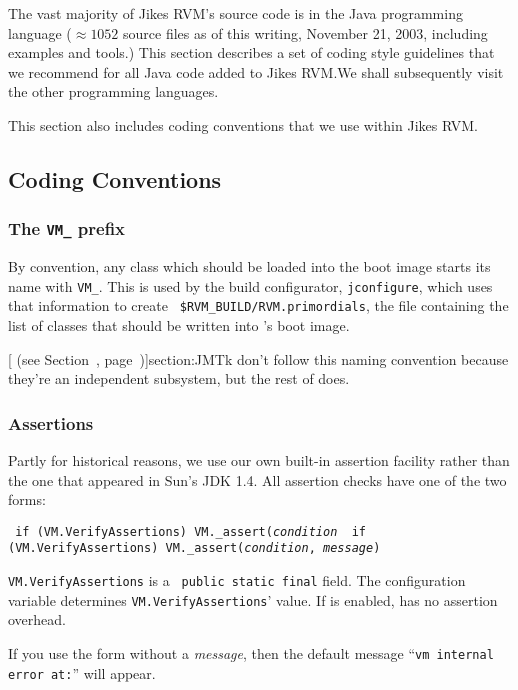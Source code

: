 The vast majority of Jikes\TMweb{} RVM's source code is in the Java\TMweb{}
programming language ($\approx 1052$ source files as of this writing,
November 21, 2003, including examples and tools.)  This section
describes a set of 
coding style guidelines that we recommend for all Java code added to
Jikes RVM.\@  We shall subsequently visit the other programming languages.

This section also includes coding conventions that we
use within Jikes RVM.\@  

\subsection{Coding Conventions}

\subsubsection{The {\tt VM\_} prefix}

By convention, any class which should be loaded into the boot image
starts its name with {\tt VM\_}.  This is used by the build configurator,
{\tt jconfigure}, which uses that information to create {\tt
\$RVM\-\_\-BUILD\-/\-R\-V\-M\-.pri\-mor\-di\-als}, the file containing the list of classes
that should be written into \jrvm{}'s  boot image.

[ (see Section~\Ref, page~\Pageref)]{section:JMTk} don't follow this naming convention
because they're an independent subsystem, but the rest of \jrvm{} does.

\subsubsection{Assertions}
\label{assertions}

Partly for historical reasons, we use our own built-in assertion
facility rather than the one that appeared in Sun\Rweb{}'s JDK 1.4.   All
assertion checks have one of the two forms:
\begin{example}
\tt{}    if (VM.VerifyAssertions)  VM._assert({\it condition}
\tt{}    if (VM.VerifyAssertions)  VM._assert({\it condition}, {\it message})
\end{example}
{\tt VM.VerifyAssertions} is a {\tt 
public static final} field.  The 
configuration variable determines {\tt VM.VerifyAssertions}' value.
If  is enabled, \jrvm{} has no assertion
overhead. 

If you use the form without a {\it message}, then the default message
``{\tt vm internal error at:}''  will appear.  

